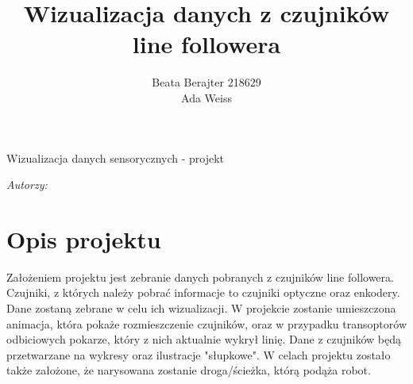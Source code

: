 \documentclass[a4paper,12pt]{article}
\author{Beata Berajter 218629\\
Ada Weiss }%
\title{Wizualizacja danych z czujników line followera}
\makeatletter
\renewcommand{\maketitle}{\begin{titlepage}  
    \vspace*{1cm}
    \begin{center}
  Wizualizacja danych sensorycznych - projekt
    \end{center}
      \vspace{3cm}
    \begin{center}
     \LARGE \textsc {\@title}
         \end{center}
     \vspace{1cm}
    
    \begin{center}
    \textit{ Autorzy:}\\
   \textit{\@author} 
     \end{center}
      \vspace{1cm}
    
    
    \vspace*{\stretch{6}}
    \begin{center}
    \@date
    \end{center}
  \end{titlepage}
}
\makeatother
\begin{document}
\newpage
\maketitle
\newpage
\tableofcontents

\newpage
\section{Opis projektu}
Założeniem projektu jest zebranie danych pobranych z czujników line followera. Czujniki, z których należy pobrać  informacje to czujniki optyczne oraz enkodery. Dane zostaną zebrane w celu ich wizualizacji. W projekcie zostanie umieszczona animacja, która pokaże rozmieszczenie czujników, oraz w przypadku transoptorów odbiciowych pokarze, który z nich aktualnie wykrył linię. Dane z czujników będą przetwarzane na wykresy oraz ilustracje "słupkowe". W celach  projektu zostało także założone, że narysowana zostanie droga/ścieżka, którą podąża robot.
\end{document}
